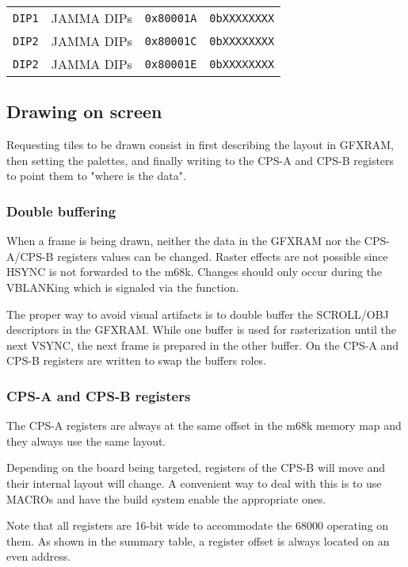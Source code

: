 \begin{tabularx}{\textwidth}{Xllr}
    \toprule   
    \texttt{DIP1} & JAMMA DIPs &  \texttt{0x80001A}    &  \texttt{0bXXXXXXXX}    \\      
    \texttt{DIP2} & JAMMA DIPs &  \texttt{0x80001C}    &  \texttt{0bXXXXXXXX}    \\      
    \texttt{DIP2} & JAMMA DIPs &  \texttt{0x80001E}    &  \texttt{0bXXXXXXXX}    \\      
  \toprule   
\end{tabularx}

\subsection{Drawing on screen}
Requesting tiles to be drawn consist in first describing the layout in GFXRAM, then setting the palettes, and finally writing to the CPS-A and CPS-B registers to point them to "where is the data".

\subsubsection{Double buffering}
When a frame is being drawn, neither the data in the GFXRAM nor the CPS-A/CPS-B registers values can be changed. Raster effects are not possible since HSYNC is not forwarded to the m68k. Changes should only occur during the VBLANKing which is signaled via the  function.

The proper way to avoid visual artifacts is to double buffer the SCROLL/OBJ descriptors in the GFXRAM. While one buffer is used for rasterization until the next VSYNC, the next frame is prepared in the other buffer. On  the CPS-A and CPS-B registers are written to swap the buffers roles.

\subsubsection{CPS-A and CPS-B registers}
The CPS-A registers are always at the same offset in the m68k memory map and they always use the same layout. 

Depending on the board being targeted, registers of the CPS-B will move and their internal layout will change. A convenient way to deal with this is to use MACROs and have the build system enable the appropriate ones.

Note that all registers are 16-bit wide to accommodate the 68000 operating on them. As shown in the summary table, a register offset is always located on an even address.

